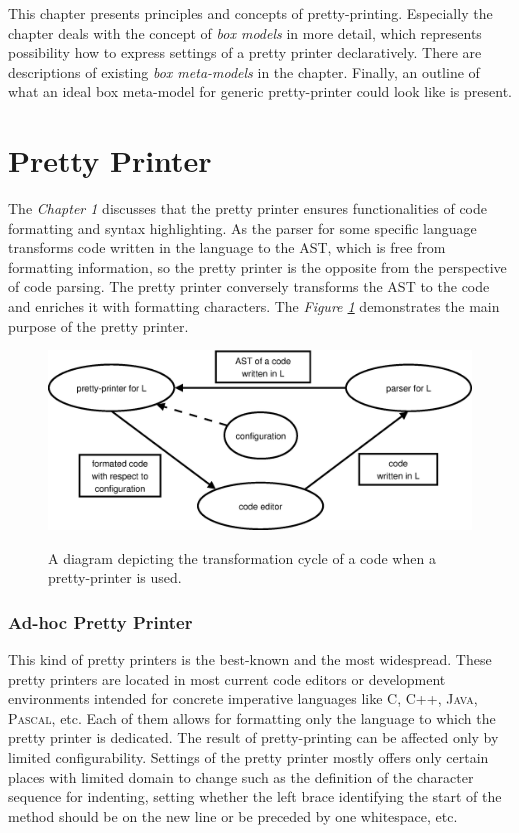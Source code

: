 \documentclass[12pt,notitlepage,a4paper]{report}
\begin{document}
This chapter presents principles and concepts of pretty-printing. Especially the chapter deals with the concept of \textit{box models} in more detail, which represents possibility how to express settings of a pretty printer declaratively. There are descriptions of existing \textit{box meta-models} in the chapter. Finally,  an outline of what an ideal box meta-model for generic pretty-printer could look like is present. 

\section {Pretty Printer}

The \textit{Chapter 1} discusses that the pretty printer ensures functionalities of code formatting and syntax highlighting. As the parser for some specific language transforms code written in the language to the AST, which is free from formatting information, so the pretty printer is the opposite from the perspective of code parsing. The pretty printer conversely transforms the AST to the code and enriches it with formatting characters. The \textit{Figure \ref{PrettyPrinterPrinciple}} demonstrates the main purpose of the pretty printer.
\begin{figure}[h!]
\centering
\caption{A diagram depicting the transformation cycle of a code when a pretty-printer is used.}
\includegraphics[scale=0.51]{pictures/PrettyPrinterPrinciple.eps}
\label{PrettyPrinterPrinciple}
\end{figure}
\noindent
\subsubsection {Ad-hoc Pretty Printer}
This kind of pretty printers is the best-known and the most widespread. These pretty printers are located in most current code editors or development environments intended for concrete imperative languages like \textsc{C}, \textsc{C++}, \textsc{Java}, \textsc{Pascal}, etc.  Each of them allows for formatting only the language to which the pretty printer is dedicated. The result of pretty-printing can be affected only by limited configurability. Settings of the pretty printer mostly offers only certain places with limited domain to change such as the definition of the character sequence for indenting, setting whether the left brace identifying the start of the method should be on the new line or be preceded by one whitespace, etc.
\end{document}
